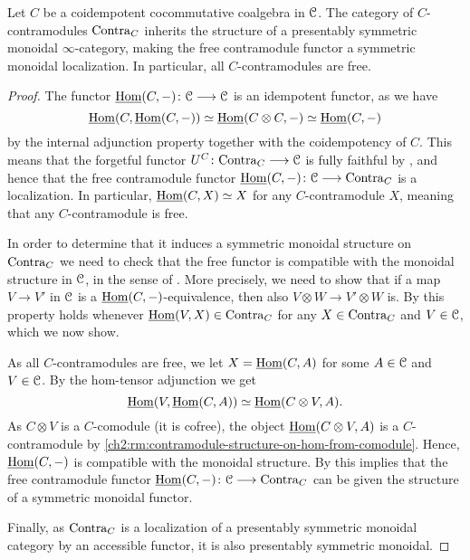 \begin{lemma}
    \label{ch2:lm:free-contra-monoidal}
    Let $C$ be a coidempotent cocommutative coalgebra in $\EuScript{C}$. The category of $C$-contramodules $\mathrm{Contra}_C$ inherits the structure of a presentably symmetric monoidal $\infty$-category, making the free contramodule functor a symmetric monoidal localization. In particular, all $C$-contramodules are free. 
\end{lemma}
\begin{proof}
    The functor $\operatorname{\underline{Hom}}(C,-)\colon \EuScript{C} \longrightarrow \EuScript{C}$ is an idempotent functor, as we have
    \[\operatorname{\underline{Hom}}(C, \operatorname{\underline{Hom}}(C,-))\simeq \operatorname{\underline{Hom}}(C\otimes C, -)\simeq \operatorname{\underline{Hom}}(C,-)\]
    by the internal adjunction property together with the coidempotency of $C$. This means that the forgetful functor $U^C\colon \mathrm{Contra}_C\longrightarrow \EuScript{C}$ is fully faithful by \cite[5.2.7.4]{lurie_09}, and hence that the free contramodule functor $\operatorname{\underline{Hom}}(C,-)\colon\EuScript{C}\longrightarrow \mathrm{Contra}_C$ is a localization. In particular, $\operatorname{\underline{Hom}}(C, X) \simeq X$ for any $C$-contramodule $X$, meaning that any $C$-contramodule is free. 
    
    In order to determine that it induces a symmetric monoidal structure on $\mathrm{Contra}_C$ we need to check that the free functor is compatible with the monoidal structure in $\EuScript{C}$, in the sense of \cite[2.2.1.7]{Lurie_HA}. More precisely, we need to show that if a map $V \to V'$ in $\EuScript{C}$ is a $\operatorname{\underline{Hom}}(C,-)$-equivalence, then also $V\otimes W \to V' \otimes W$ is. By \cite[2.12(3)]{nikolaus_2016} this property holds whenever $\operatorname{\underline{Hom}}(V,X)\in \mathrm{Contra}_C$ for any $X\in \mathrm{Contra}_C$ and $V\in \EuScript{C}$, which we now show. 
    
    As all $C$-contramodules are free, we let $X = \operatorname{\underline{Hom}}(C, A)$ for some $A\in \EuScript{C}$ and $V\in \EuScript{C}$. By the hom-tensor adjunction we get 
    \[\operatorname{\underline{Hom}}(V, \operatorname{\underline{Hom}}(C, A))\simeq \operatorname{\underline{Hom}}(C\otimes V, A).\]
    As $C\otimes V$ is a $C$-comodule (it is cofree), the object $\operatorname{\underline{Hom}}(C\otimes V, A)$ is a $C$-contramodule by \cref{ch2:rm:contramodule-structure-on-hom-from-comodule}. Hence, $\operatorname{\underline{Hom}}(C,-)$ is compatible with the monoidal structure. By \cite[2.2.1.9]{lurie_09} this implies that the free contramodule functor $\operatorname{\underline{Hom}}(C,-)\colon \EuScript{C}\longrightarrow \mathrm{Contra}_C$ can be given the structure of a symmetric monoidal functor. 
    
    Finally, as $\mathrm{Contra}_C$ is a localization of a presentably symmetric monoidal category by an accessible functor, it is also presentably symmetric monoidal.  
\end{proof}

